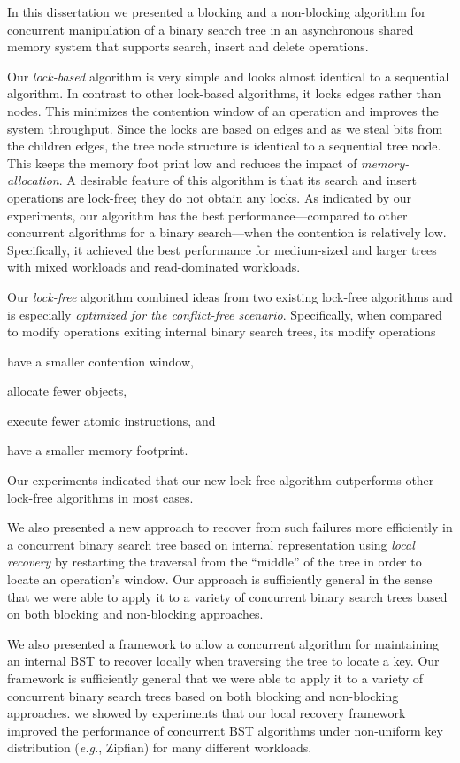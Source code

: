 In this dissertation we presented a blocking and a non-blocking algorithm for concurrent manipulation of a binary search tree in an asynchronous shared memory system that supports search, insert and delete operations. 

Our \emph{lock-based} algorithm is very simple and looks almost identical to a sequential algorithm. In contrast to other lock-based algorithms, it locks edges rather than nodes. This minimizes the contention window of an operation and improves the system throughput. Since the locks are based on edges and as we steal bits from the children edges, the tree node structure is identical to a sequential tree node. This keeps the memory foot print low and reduces the impact of \emph{memory-allocation}. A desirable feature of this algorithm is that its search and insert operations are lock-free; they do not obtain any locks. As indicated by our experiments, our algorithm has the best performance---compared to other concurrent algorithms for a binary search---when the contention is relatively low. Specifically, it achieved the best performance for medium-sized and larger trees with mixed workloads and read-dominated workloads.

Our \emph{lock-free} algorithm combined ideas from two existing lock-free algorithms and is especially \emph{optimized for the conflict-free scenario}. Specifically, when compared to modify operations exiting internal binary search trees, its modify operations 
\begin{enumerate*}[label=(\alph*)]
\item have a smaller contention window, 
\item allocate fewer objects, 
\item execute fewer atomic instructions, and 
\item have a smaller memory footprint. 
\end{enumerate*}
Our experiments indicated that our new lock-free algorithm outperforms other lock-free algorithms in most cases.


We also presented a new approach to recover from such failures more efficiently in a concurrent binary search tree based on internal representation using \emph{local recovery} by restarting the traversal from the ``middle'' of the tree in order to locate an operation's window. Our approach is sufficiently general in the sense that we were able to apply it to a variety of concurrent binary search trees based on both blocking and non-blocking approaches.

We also presented a framework to allow a concurrent algorithm for maintaining an internal BST to recover locally when traversing the tree to locate a key. Our framework is sufficiently general that we were able to apply it to a variety of concurrent binary search trees based on both blocking and non-blocking approaches. we showed by experiments that our local recovery framework improved the performance of  concurrent BST algorithms under non-uniform key distribution (\emph{e.g.}, Zipfian) for many different workloads.

